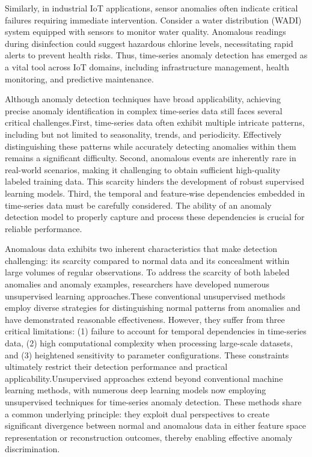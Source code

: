 \documentclass[sigconf]{acmart}
\begin{document}
Similarly, in industrial IoT applications, sensor anomalies often indicate critical
failures requiring immediate intervention. Consider a water distribution (WADI) system 
equipped with sensors to monitor water quality. Anomalous readings during disinfection 
could suggest hazardous chlorine levels, necessitating rapid alerts to prevent 
health risks. Thus, time-series anomaly detection has emerged as a vital tool across IoT 
domains, including infrastructure management, health monitoring, 
and predictive maintenance.

Although anomaly detection techniques have broad applicability, 
achieving precise anomaly identification in complex time-series data 
still faces several critical challenges.First, time-series data often 
exhibit multiple intricate patterns, including but not limited to 
seasonality, trends, and periodicity. Effectively distinguishing these 
patterns while accurately detecting anomalies within them remains 
a significant difficulty. Second, anomalous events are inherently rare 
in real-world scenarios, making it challenging to obtain sufficient high-quality 
labeled training data. This scarcity hinders the development of robust 
supervised learning models. Third, the temporal and feature-wise 
dependencies embedded in time-series data must be carefully considered. 
The ability of an anomaly detection model to properly capture and 
process these dependencies is crucial for reliable performance.

Anomalous data exhibits two inherent characteristics that make detection 
challenging: its scarcity compared to normal data and its concealment within 
large volumes of regular observations. To address the scarcity of 
both labeled anomalies and anomaly examples, researchers have developed 
numerous unsupervised learning approaches.These conventional unsupervised 
methods employ diverse strategies for distinguishing normal patterns from 
anomalies and have demonstrated reasonable effectiveness. However, they 
suffer from three critical limitations: (1) failure to account for temporal 
dependencies in time-series data, (2) high computational complexity when 
processing large-scale datasets, and (3) heightened sensitivity to parameter 
configurations. These constraints ultimately restrict their detection 
performance and practical applicability.Unsupervised approaches extend beyond 
conventional machine learning methods, with numerous deep learning models now employing 
unsupervised techniques for time-series anomaly detection. These 
methods share a common underlying principle: they exploit dual perspectives 
to create significant divergence between normal and anomalous data in either feature 
space representation or reconstruction outcomes, thereby enabling effective anomaly discrimination.
\end{document}
